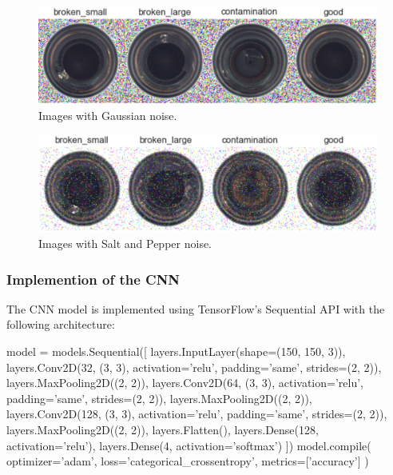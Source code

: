 \begin{figure}[H]
    \centering
    \includegraphics[scale=0.55]{src/images/dataset_w_gnoise.png}
    \caption{Images with Gaussian noise.}
    \label{fig:Gnoise}
\end{figure}
\begin{figure}[H]
    \centering
    \includegraphics[scale=0.55]{src/images/dataset_w_snp.png}
    \caption{Images with Salt and Pepper noise.}
    \label{fig:snpnoise}
\end{figure}

\subsubsection{Implemention of the CNN} %
The CNN model is implemented using TensorFlow's Sequential API with the following architecture:
\vspace{0.3cm}
\begin{python}
model = models.Sequential([
    layers.InputLayer(shape=(150, 150, 3)), 
    layers.Conv2D(32, (3, 3), activation='relu', padding='same', strides=(2, 2)),
    layers.MaxPooling2D((2, 2)),
    layers.Conv2D(64, (3, 3), activation='relu', padding='same', strides=(2, 2)),
    layers.MaxPooling2D((2, 2)),
    layers.Conv2D(128, (3, 3), activation='relu', padding='same', strides=(2, 2)),
    layers.MaxPooling2D((2, 2)),
    layers.Flatten(),
    layers.Dense(128, activation='relu'),
    layers.Dense(4, activation='softmax')
])
model.compile(
    optimizer='adam',
    loss='categorical_crossentropy',
    metrics=['accuracy']
)
\end{python}
